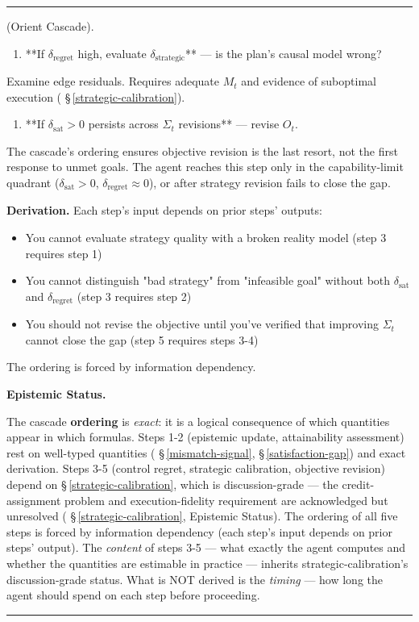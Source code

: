 \documentclass[11pt,oneside]{article}
\newcounter{claim}[section]
\renewcommand{\theclaim}{\thesection.\arabic{claim}}
\newenvironment{segment}[2]{%
  \refstepcounter{claim}%
  \bigskip\noindent\hrule\smallskip
  \noindent{\bfseries #1~\theclaim}\enskip(#2).\par\smallskip
  \noindent\ignorespaces
}{%
  \par\smallskip\noindent\hrule\bigskip
}
\newenvironment{proposition}[1][]{\begin{segment}{Proposition}{#1}}{\end{segment}}
\begin{document}
\begin{proposition}[Orient Cascade]
\begin{enumerate}
  \item **If $\delta_{\text{regret}}$ high, evaluate $\delta_{\text{strategic}}$** — is the plan's causal model wrong?
\end{enumerate}

Examine edge residuals. Requires adequate $M_t$ and evidence of suboptimal execution ( \S\,\ref{strategic-calibration}).

\begin{enumerate}
  \item **If $\delta_{\text{sat}} > 0$ persists across $\Sigma_t$ revisions** — revise $O_t$.
\end{enumerate}

The cascade's ordering ensures objective revision is the last resort, not the first response to unmet goals. The agent reaches this step only in the capability-limit quadrant ($\delta_{\text{sat}} > 0$, $\delta_{\text{regret}} \approx 0$), or after strategy revision fails to close the gap.

\textbf{Derivation.} Each step's input depends on prior steps' outputs:
\begin{itemize}
  \item You cannot evaluate strategy quality with a broken reality model (step 3 requires step 1)
  \item You cannot distinguish "bad strategy" from "infeasible goal" without both $\delta_{\text{sat}}$ and $\delta_{\text{regret}}$ (step 3 requires step 2)
  \item You should not revise the objective until you've verified that improving $\Sigma_t$ cannot close the gap (step 5 requires steps 3-4)
\end{itemize}


The ordering is forced by information dependency.


\medskip\noindent\textbf{Epistemic Status.}


The cascade \textbf{ordering} is \textit{exact}: it is a logical consequence of which quantities appear in which formulas. Steps 1-2 (epistemic update, attainability assessment) rest on well-typed quantities ( \S\,\ref{mismatch-signal}, \S\,\ref{satisfaction-gap}) and exact derivation. Steps 3-5 (control regret, strategic calibration, objective revision) depend on \S\,\ref{strategic-calibration}, which is discussion-grade — the credit-assignment problem and execution-fidelity requirement are acknowledged but unresolved ( \S\,\ref{strategic-calibration}, Epistemic Status). The ordering of all five steps is forced by information dependency (each step's input depends on prior steps' output). The \textit{content} of steps 3-5 — what exactly the agent computes and whether the quantities are estimable in practice — inherits strategic-calibration's discussion-grade status. What is NOT derived is the \textit{timing} — how long the agent should spend on each step before proceeding.



\end{proposition}
\end{document}
